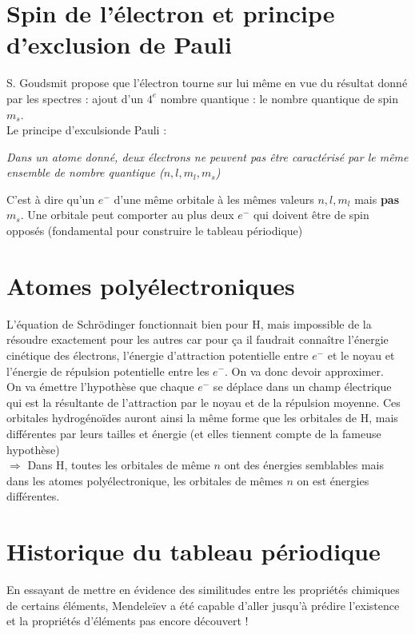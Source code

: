 \documentclass	[11pt, a4paper, openany]{book}
\begin{document}
\section{Spin de l'électron et principe d'exclusion de Pauli}
S. Goudsmit propose que l'électron tourne sur lui même en vue du résultat donné par les spectres : ajout d'un $4^e$ nombre quantique : le nombre quantique de spin $m_s$.\\
Le principe d'exculsionde Pauli : 
\begin{center}
	\textit{Dans un atome donné, deux électrons ne peuvent pas être caractérisé par le même ensemble de nombre quantique ($n, l, m_l, m_s$)}
\end{center}
C'est à dire qu'un $e^-$ d'une même orbitale à les mêmes valeurs $n, l, m_l$ mais \textbf{pas} $m_s$. Une orbitale peut comporter au plus deux $e^-$ qui doivent être de spin opposés (fondamental pour construire le tableau périodique)

\section{Atomes polyélectroniques}
L'équation de Schrödinger fonctionnait bien pour H, mais impossible de la résoudre exactement pour les autres car pour ça il faudrait connaître l'énergie cinétique des électrons, l'énergie d'attraction potentielle entre $e^-$ et le noyau et l'énergie de répulsion potentielle entre les $e^-$. On va donc devoir approximer.\\

On va émettre l'hypothèse que chaque $e^-$ se déplace dans un champ électrique qui est la résultante de l'attraction par le noyau et de la répulsion moyenne. Ces orbitales hydrogénoïdes auront ainsi la même forme que les orbitales de H, mais différentes par leurs tailles et énergie (et elles tiennent compte de la fameuse hypothèse)\\

$\Rightarrow$ Dans H, toutes les orbitales de même $n$ ont des énergies semblables mais dans les atomes polyélectronique, les orbitales de mêmes $n$ on est énergies différentes.

\section{Historique du tableau périodique}
En essayant de mettre en évidence des similitudes entre les propriétés chimiques de certains éléments, Mendeleïev a été capable d'aller jusqu'à prédire l'existence et la propriétés d'éléments pas encore découvert ! 
\end{document}
